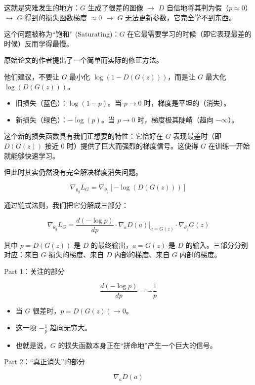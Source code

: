 这就是灾难发生的地方：\(G\) 生成了很差的图像 \(\rightarrow\) \(D\) 自信地将其判为假（\(p\approx 0\)）\(\rightarrow\) \(G\) 得到的损失函数梯度 \(\approx 0\) \(\rightarrow\) \(G\) 无法更新参数，它完全学不到东西。

这个问题被称为``饱和'' (Saturating)：\(G\) 在它最需要学习的时候（即它表现最差的时候）反而学得最慢。

原始论文的作者提出了一个简单而实际的修正方法。

他们建议，不要让 \(G\) 最小化 \(\log(1-D(G(z)))\)，而是让 \(G\) 最大化 \(\log(D(G(z)))\)。

\begin{itemize}
\tightlist
\item
  旧损失（蓝色）：\(\log(1-p)\)。当 \(p \rightarrow 0\) 时，梯度是平坦的（消失）。
\item
  新损失（绿色）：\(-\log(p)\)。当 \(p \rightarrow 0\) 时，梯度极其陡峭（趋向 \(-\infty\)）。
\end{itemize}

这个新的损失函数具有我们正想要的特性：它恰好在 \(G\) 表现最差时（即 \(D(G(z))\) 接近 0 时）提供了巨大而强烈的梯度信号。这使得 \(G\) 在训练一开始就能够快速学习。

但此时其实仍然没有完全解决梯度消失问题。

\[
\nabla_{\theta_g} L_G = \nabla_{\theta_g}[-\log(D(G(z)))]
\]

通过链式法则，我们把它分解成三部分：

\[
\nabla_{\theta_g} L_G =
\frac{d(-\log p)}{dp}
\cdot
\nabla_a D(a)\rvert_{a=G(z)}
\cdot
\nabla_{\theta_g} G(z)
\]

其中 \(p=D(G(z))\) 是 \(D\) 的最终输出，\(a=G(z)\) 是 \(D\) 的输入。三部分分别对应：来自 \(G\) 损失的梯度、来自 \(D\) 内部的梯度、来自 \(G\) 内部的梯度。

Part 1：关注的部分

\[
\frac{d(-\log p)}{dp}=-\frac{1}{p}
\]

\begin{itemize}
\tightlist
\item
  当 \(G\) 很差时，\(p=D(G(z)) \rightarrow 0\)。
\item
  这一项 \(-\frac{1}{p}\) 趋向无穷大。
\item
  也就是说，\(G\) 的损失函数本身正在``拼命地''产生一个巨大的信号。
\end{itemize}

Part 2：``真正消失''的部分

\[
\nabla_a D(a)
\]

